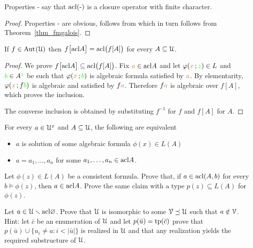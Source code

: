 Properties - say that ${\rm acl}(\mbox{-})$ is a closure operator with finite character.

\begin{proof}
Properties - are obvious,  follows from  which in turn follows from Theorem~\ref{thm_fmgalois}.
\end{proof}

\begin{proposition}\label{prop_estensionemappechiusuraalgebrica}
If $f\in{\rm Aut\kern.15ex}(\EuScript U)$ then $f\big[{\rm acl} A\big]={\rm acl}\big(f[A]\big)$ for every $A\subseteq\EuScript U$.
\end{proposition}

\begin{proof}
We prove $f\big[{\rm acl} A\big]\subseteq{\rm acl}\big(f[A]\big)$.
Fix ${\color{brown} a}\in{\rm acl} A$ and let $\varphi({\color{brown} x}\,;{\color{green} z})\in L$ and ${\color{green} b}\in A^{\color{green} z}$ be such that 
$\varphi({\color{brown} x}\,;{\color{green} b})$ is algebraic formula satisfied by ${\color{brown} a}$.
By elementarity, $\varphi({\color{brown} x}\,;f{\color{green} b})$ is algebraic and satisfied by $f{\color{brown} a}$.
Therefore  $f{\color{brown} a}$ is algebraic over $f[A]$, which proves the inclusion.

The converse inclusion is obtained by substituting  $f^{-1}$ for $f$ and $f[A]$ for $A$.
\end{proof}

\begin{exercise}
  For every $a\in\EuScript U^{x}$ and $A\subseteq\EuScript U$, the following are equivalent
  \begin{itemize}
  \item[1.] $a$ is solution of some algebraic formula  $\phi(x)\in L(A)$
  \item[2.] $a=a_1,\dots,a_n$ for some $a_1,\dots,a_n\in{\rm acl} A$.
  \end{itemize}
  \end{exercise}
  
\begin{exercise}\label{pofu}
  Let $\phi(z)\in L(A)$ be a consistent formula.
  Prove that, if $a\in{\rm acl}(A,b)$ for every $b\models\phi(z)$, then $a\in{\rm acl} A$.
  Prove the same claim with a type $p(z)\subseteq L(A)$ for $\phi(z)$.
\end{exercise}

\begin{exercise}\label{ex_isosub}
Let $a\in\EuScript U\smallsetminus{\rm acl}\varnothing$.
Prove that $\EuScript U$ is isomorphic to some $\EuScript V\preceq \EuScript U$ such that $a\notin\EuScript V$.
Hint: let $\bar c$ be an enumeration of $\EuScript U$ and let $p(\bar u)={\rm tp}(\bar c)$ prove that 
$p(\bar u)\cup\big\{ u_i\neq a :i<|\bar u|\big\}$ is realized in $\EuScript U$ and 
that any realization yields the required substructure of $\EuScript U$.
\end{exercise}


